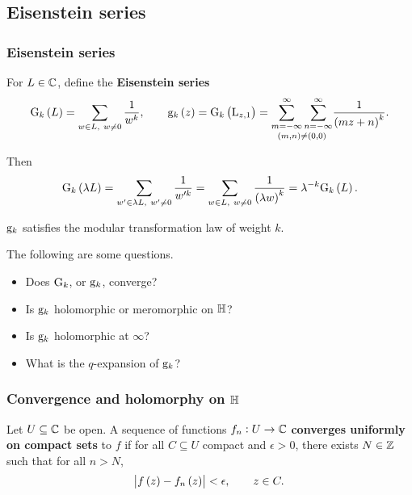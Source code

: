 \subsection{Eisenstein series}

\subsubsection{Eisenstein series}


\begin{definition}
For $ L \in \mathbb{C} $, define the \textbf{Eisenstein series}
$$ \G_k\br{L} = \sum_{w \in L, \ w \ne 0} \dfrac{1}{w^k}, \qquad \g_k\br{z} = \G_k\br{\L_{z, 1}} = \underset{\br{m, n} \ne \br{0, 0}}{\sum_{m = -\infty}^\infty \sum_{n = -\infty}^\infty} \dfrac{1}{\br{mz + n}^k}. $$
\end{definition}

Then
$$ \G_k\br{\lambda L} = \sum_{w' \in \lambda L, \ w' \ne 0} \dfrac{1}{w'^k} = \sum_{w \in L, \ w \ne 0} \dfrac{1}{\br{\lambda w}^k} = \lambda^{-k}\G_k\br{L}. $$

\begin{corollary}
$ \mathrm{g}_k $ satisfies the modular transformation law of weight $ k $.
\end{corollary}

The following are some questions.
\begin{itemize}
\item Does $ \mathrm{G}_k $, or $ \mathrm{g}_k $, converge?
\item Is $ \mathrm{g}_k $ holomorphic or meromorphic on $ \mathbb{H} $?
\item Is $ \mathrm{g}_k $ holomorphic at $ \infty $?
\item What is the $ q $-expansion of $ \mathrm{g}_k $?
\end{itemize}

\subsubsection{Convergence and holomorphy on \texorpdfstring{$ \mathbb{H} $}{H}}

\begin{definition}
Let $ U \subseteq \mathbb{C} $ be open. A sequence of functions $ f_n : U \to \mathbb{C} $ \textbf{converges uniformly on compact sets} to $ f $ if for all $ C \subseteq U $ compact and $ \epsilon > 0 $, there exists $ N \in \mathbb{Z} $ such that for all $ n > N $,
$$ \abs{f\br{z} - f_n\br{z}} < \epsilon, \qquad z \in C. $$
\end{definition}

